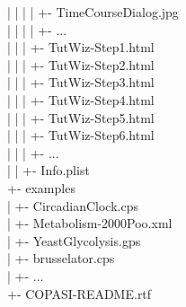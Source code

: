 \documentclass[12pt]{book}
\begin{document}
{\begin{tabbing}
 \> | \> | \> | \> \> \> | \> +- TimeCourseDialog.jpg \\
 \> | \> | \> | \> \> \> | \> +- ... \\
 \> | \> | \> | \> \> \> +- TutWiz-Step1.html \\
 \> | \> | \> | \> \> \> +- TutWiz-Step2.html \\
 \> | \> | \> | \> \> \> +- TutWiz-Step3.html \\
 \> | \> | \> | \> \> \> +- TutWiz-Step4.html \\
 \> | \> | \> | \> \> \> +- TutWiz-Step5.html \\
 \> | \> | \> | \> \> \> +- TutWiz-Step6.html \\
 \> | \> | \> | \> \> \> +- ... \\
 \> | \> | \> +- Info.plist \\
 \> +- examples \\
 \> | \> +- CircadianClock.cps \\
 \> | \> +- Metabolism-2000Poo.xml \\
 \> | \> +- YeastGlycolysis.gps \\
 \> | \> +- brusselator.cps \\
 \> | \> +- ... \\
 \> +- COPASI-README.rtf \\
\end{tabbing}
}
\end{document}
